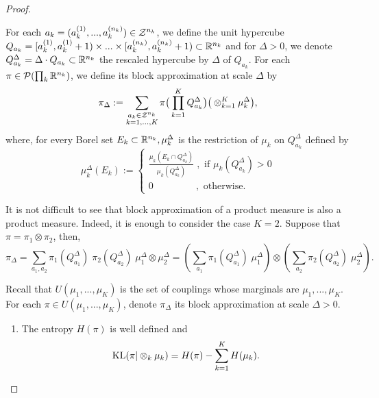\begin{proof}
\begin{definition}
      For each $a_k = (a_k^{(1)}, ...,a_k^{(n_k)}) \in \mathcal Z^{n_k}$, we define the unit hypercube
      $Q_{a_k} = [a_k^{(1)}, a_k^{(1)} + 1) \times ... \times [a_k^{(n_k)}, a_k^{(n_k)} + 1) \subset \mathbb R^{n_k}$ and for $\Delta > 0$,
      we denote $Q^{\Delta}_{a_k} = \Delta \cdot Q_{a_k} \subset \mathbb R^{n_k}$ the rescaled hypercube by $\Delta$ of $Q_{a_k}$.
      For each $\pi \in \mathcal P(\prod_k \mathbb R^{n_k})$, we define its block approximation at scale $\Delta$ by
      \begin{equation}
        \pi_{\Delta} := \sum_{\substack{a_k \in \mathcal Z^{n_k} \\ k = 1, ..., K}}
        \pi \big(\prod_{k=1}^K Q^{\Delta}_{a_k}\big) \big( \otimes_{k=1}^K \mu_k^{\Delta} \big),
      \end{equation}
      where, for every Borel set $E_k \subset \mathbb R^{n_k}, \mu_k^{\Delta}$ is the restriction of $\mu_k$ on $Q^{\Delta}_{a_k}$ defined by
      \begin{equation}
        \mu_k^{\Delta}(E_k):=
        \begin{cases}
          \frac{\mu_k(E_k \cap Q^{\Delta}_{a_k})}{\mu_k(Q^{\Delta}_{a_k})} \; ,\text{ if } \mu_k(Q^{\Delta}_{a_k}) > 0 \\
          0 \;\;\;\;\;\;\;\;\;\;\;\;\;\;\;\;,\text{ otherwise}.
        \end{cases}
      \end{equation}
    \end{definition}
    It is not difficult to see that block approximation of a product measure is also a product measure. Indeed, it is enough to consider the case
    $K=2$. Suppose that $\pi = \pi_1 \otimes \pi_2$, then,
    \begin{equation}
      \pi_{\Delta} = \sum_{a_1, a_2}
      \pi_1(Q^{\Delta}_{a_1}) \; \pi_2(Q^{\Delta}_{a_2}) \; \mu_1^{\Delta} \otimes \mu_2^{\Delta} =
      \left( \sum_{a_1} \pi_1(Q^{\Delta}_{a_1}) \; \mu_1^{\Delta} \right) \otimes
      \left( \sum_{a_2} \pi_2(Q^{\Delta}_{a_2}) \; \mu_2^{\Delta} \right).
    \end{equation}
    \begin{lemma}
        \label{lemma:block_approx}
      Recall that $U(\mu_1, ..., \mu_K)$ is the set of couplings whose marginals are $\mu_1,...,\mu_K$.
      For each $\pi \in U(\mu_1, ..., \mu_K)$, denote $\pi_{\Delta}$ its block approximation at scale $\Delta > 0$.
      \begin{enumerate}
        \item The entropy $H(\pi)$ is well defined and
        \begin{equation}
          \text{KL}(\pi \vert \otimes_k \mu_k) = H(\pi) - \sum_{k=1}^K H(\mu_k).
        \end{equation}


\end{enumerate}
\end{lemma}
\end{proof}
